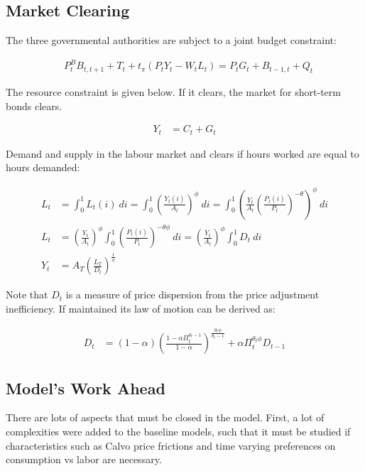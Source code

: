 \documentclass[12pt]{article}
\begin{document}
\subsection{Market Clearing}

The three governmental authorities are subject to a joint budget constraint:

\begin{align*}
    &P_{t}^{B}B_{t,t+1}+T_{t}+t_{\pi}(P_{t}Y_{t}-W_{t}L_{t})=P_{t}G_{t}+B_{t-1,t}+Q_t
\end{align*}

The resource constraint is given below. If it clears, the market for short-term bonds clears.

\begin{align*}
    Y_t &= C_t + G_t
\end{align*}

Demand and supply in the labour market and clears if hours worked are equal to hours demanded:

\begin{align*}
    L_t &= \int^1_0 L_t(i) ~di = \int^1_0 \left(\frac{Y_t(i)}{A_t}\right)^\phi ~di = \int^1_0 \left(\frac{Y_t}{A_t}\left(\frac{P_t(i)}{P_t}\right)^{-\theta}\right)^\phi ~di\\
    L_t &= \left(\frac{Y_t}{A_t}\right)^\phi\int^1_0 \left(\frac{P_t(i)}{P_t}\right)^{-\theta\phi} ~di = \left(\frac{Y_t}{A_t}\right)^\phi\int^1_0 D_t ~di\\
    Y_t &= A_T \left(\frac{L_T}{D_t}\right)^\frac{1}{\phi}
\end{align*}

Note that $D_t$ is a measure of price dispersion from the price adjustment inefficiency. If maintained its law of motion can be derived as:

\begin{align*}
    D_t &= (1-\alpha)\left(\frac{1 - \alpha\Pi_t^{\theta_t-1}}{1-\alpha}\right)^{\frac{\theta_t\phi}{\theta_t-1}} + \alpha \Pi_{t}^{\theta_{t}\phi}D_{t-1}
\end{align*}


\subsection{Model's Work Ahead}

There are lots of aspects that must be closed in the model. First, a lot of complexities were added to the baseline models, such that it must be studied if characteristics such as Calvo price frictions and time varying preferences on consumption vs labor are necessary.
\end{document}
